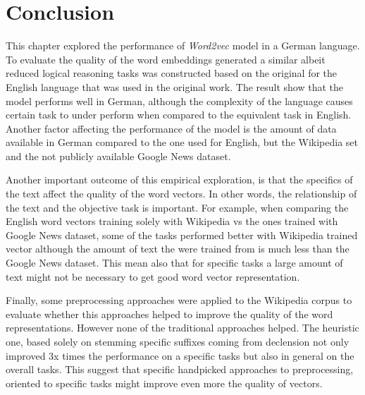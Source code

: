 


\section{Conclusion}
\label{sec:conclusion_and_future_work}   

This chapter explored the performance of \textit{Word2vec} model in a German
language. To evaluate the quality of the word embeddings generated a  similar
albeit reduced logical reasoning tasks was constructed  based on the original
for the English language that was used in the original work. The result show
that the model performs well in German, although the complexity of the
language causes certain task to under perform when compared to the equivalent
task in English. Another factor affecting the performance of the model is the
amount of data available in German compared to the one used for English, but
the Wikipedia set and the not publicly available Google News dataset.

Another important outcome of this  empirical exploration, is that the specifics
of the text affect the quality of the word vectors.  In other words, the
relationship of the text and the objective task is important.  For example,
when comparing the English word vectors training solely with Wikipedia vs the
ones trained with Google News dataset, some of the tasks performed better
with Wikipedia trained vector  although the amount of text the were trained
from is much less than the Google News dataset. This mean also that for
specific tasks a large amount of text might not be necessary to get good word
vector representation.

Finally,  some  preprocessing approaches were applied to the Wikipedia
corpus to evaluate whether this approaches helped to improve the quality of
the word representations. However none of the traditional approaches helped.
The heuristic one, based solely on stemming specific suffixes coming from
declension not only improved  3x times the performance on a specific tasks
but also in general on the overall tasks. This suggest that specific
handpicked approaches to preprocessing, oriented to specific tasks  might improve even more the quality of
vectors.


